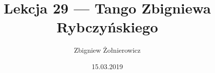 \documentclass{article}
\begin{document}
\title{Lekcja 29 --- Tango Zbigniewa Rybczyńskiego}
\author{Zbigniew Żołnierowicz}
\date{15.03.2019}
\maketitle
\end{document}
